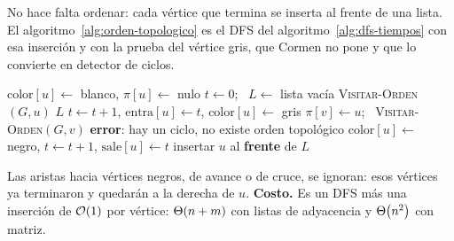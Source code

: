 \documentclass[11pt,letterpaper]{article}
\begin{document}
No hace falta ordenar: cada vértice que termina se inserta al frente
de una lista. El algoritmo~\ref{alg:orden-topologico} es el DFS del
algoritmo~\ref{alg:dfs-tiempos} con esa inserción y con la prueba del
vértice gris, que Cormen no pone y que lo convierte en detector de
ciclos.

\begin{algorithm}[H]
\caption{\textsc{Orden-Topológico}$(G)$, con DFS y detección de
         ciclos}
\label{alg:orden-topologico}
\begin{algorithmic}[1]
    \State $\text{color}[u] \gets$ blanco, \quad $\pi[u] \gets$ nulo
  \EndFor
  \State $t \gets 0$; \ $L \gets$ lista vacía
      \State \textsc{Visitar-Orden}$(G, u)$
    \EndIf
  \EndFor
  \State \Return $L$
\EndProcedure
\Statex
{}
  \State $t \gets t + 1$, \quad $\text{entra}[u] \gets t$, \quad
         $\text{color}[u] \gets$ gris
      \State $\pi[v] \gets u$; \ \textsc{Visitar-Orden}$(G, v)$
     
      \State \textbf{error}: hay un ciclo, no existe orden topológico
    \EndIf
  \EndFor
  \State $\text{color}[u] \gets$ negro, \quad $t \gets t + 1$, \quad
         $\text{sale}[u] \gets t$
  \State insertar $u$ al \textbf{frente} de $L$
\EndProcedure
\end{algorithmic}
\end{algorithm}

Las aristas hacia vértices negros, de avance o de cruce, se ignoran:
esos vértices ya terminaron y quedarán a la derecha de $u$.
\textbf{Costo.} Es un DFS más una inserción de $\mathcal{O}\!\left(1\right)$ por vértice:
$\Theta\!\left(n + m\right)$ con listas de adyacencia y $\Theta\!\left(n^2\right)$ con matriz.
\end{document}
